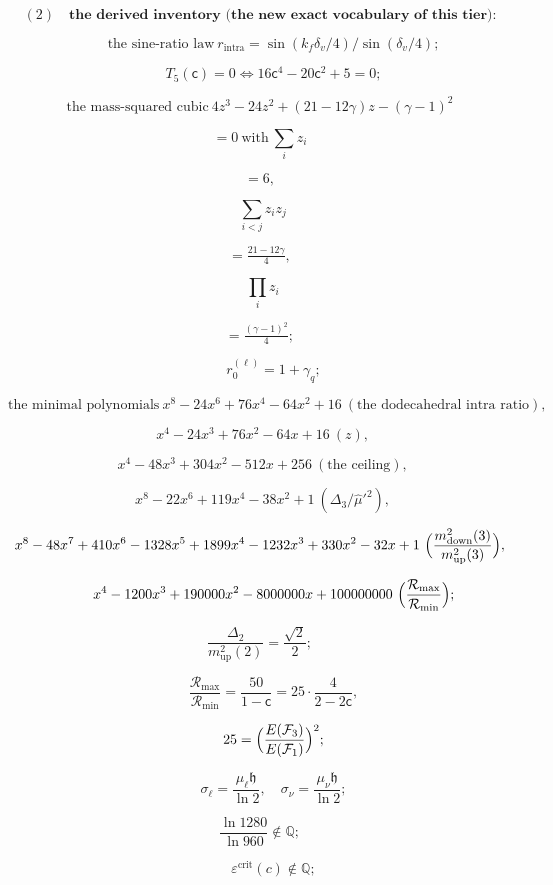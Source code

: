 \documentclass[11pt,openany]{report}
\theoremstyle{canonplain}
\theoremstyle{canondef}
\begin{document}
\[
(2)\quad\textbf{the derived inventory (the new exact vocabulary of this tier):}
\]

\[
\qquad \text{the sine-ratio law}\ r_{\mathrm{intra}}=\sin(k_f\delta_v/4)/\sin(\delta_v/4);
\]

\[
\qquad T_5(\mathsf c)=0\iff16\mathsf c^4-20\mathsf c^2+5=0;
\]

\[
\text{the mass-squared cubic}\ 4z^3-24z^2+(21-12\gamma)z-(\gamma-1)^2
\]

\[
= 0\ \text{with}\ \sum_iz_i
\]

\[
= 6,
\]

\[
\ \ \sum_{i<j}z_iz_j
\]

\[
= \tfrac{21-12\gamma}4,
\]

\[
\ \ \prod_iz_i
\]

\[
= \tfrac{(\gamma-1)^2}4;
\]

\[
\qquad r^{(\ell)}_0=1+\gamma_q;
\]

\[
\text{the minimal polynomials}\ x^8-24x^6+76x^4-64x^2+16\ (\text{the dodecahedral intra ratio}),
\]

\[
\ \ x^4-24x^3+76x^2-64x+16\ (z),
\]

\[
\ \ x^4-48x^3+304x^2-512x+256\ (\text{the ceiling}),
\]

\[
\ \ x^8-22x^6+119x^4-38x^2+1\ (\Delta_3/\hat\mu'^2),
\]

\[
x^8-48x^7+410x^6-1328x^5+1899x^4-1232x^3+330x^2-32x+1\ \Bigl(\frac{m^2_{\mathrm{down}}(3)}{m^2_{\mathrm{up}}(3)}\Bigr),
\]

\[
\qquad x^4-1200x^3+190000x^2-8000000x+100000000\ \Bigl(\frac{\mathcal R_{\max}}{\mathcal R_{\min}}\Bigr);
\]

\[
\frac{\Delta_2}{m^2_{\mathrm{up}}(2)}=\frac{\sqrt2}2;
\]

\[
\qquad \frac{\mathcal R_{\max}}{\mathcal R_{\min}}=\frac{50}{1-\mathsf c}=25\cdot\frac{4}{2-2\mathsf c},
\]

\[
\qquad 25=\Bigl(\frac{E(\mathcal F_3)}{E(\mathcal F_1)}\Bigr)^2;
\]

\[
\qquad \sigma_\ell=\frac{\mu_\ell\mathfrak h}{\ln2},\quad\sigma_\nu=\frac{\mu_\nu\mathfrak h}{\ln2};
\]

\[
\frac{\ln1280}{\ln960}\notin\mathbb Q;
\]

\[
\qquad \varepsilon^{\mathrm{crit}}(c)\notin\mathbb Q;
\]
\end{document}
